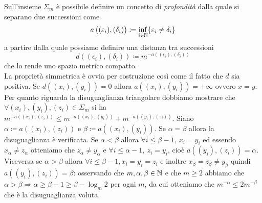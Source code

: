 Sull'insieme $ \Sigma_m $ è possibile definire un concetto di \emph{profondità} dalla quale si separano due successioni come 
\[
a\left((\varepsilon_i), (\delta_i)\right) \coloneqq \inf_{i \in \mathbb{N}} \{\varepsilon_i \neq \delta_i\}
\]
a partire dalla quale possiamo definire una distanza tra successioni
\[
d\left((\epsilon_i), (\delta_i)\right) \coloneqq m^{-a\left((\epsilon_i), (\delta_i)\right)}
\]
che lo rende uno spazio metrico compatto. \\

La proprietà simmetrica è ovvia per costruzione così come il fatto che $ d $ sia positiva. Se $ d((x_i), (y_i)) = 0 $ allora $ a((x_i), (y_i)) = +\infty $ ovvero $ x = y $. Per quanto riguarda la disuguaglianza triangolare dobbiamo mostrare che $ \forall (x_i), (y_i), (z_i) \in \Sigma_m $ si ha $ m^{-a((x_i),(z_i))} \leq m^{-a((x_i), (y_i))} + m^{-a((y_i), (z_i))} $. Siano $ \alpha \coloneqq a((x_i), (z_i)) $ e $ \beta \coloneqq a((x_i), (y_i)) $. Se $ \alpha = \beta $ allora la disuguaglianza è verificata. Se $ \alpha < \beta $ allora $ \forall i \leq \beta-1, \ x_i = y_i $ ed essendo $ x_\alpha \neq z_\alpha $ otteniamo che $ z_\alpha \neq y_\alpha $ e $ \forall i \leq \alpha-1, \ z_i = y_i $, cioè $ a((y_i), (z_i)) = \alpha $. Viceversa se $ \alpha > \beta $ allora $ \forall i \leq \beta-1, x_i=y_i=z_i $ e inoltre $ x_\beta=z_\beta \neq y_\beta $ quindi $ a((y_i), (z_i)) = \beta $: osservando che $ m, \alpha, \beta \in \mathbb{N} $ e che $ m \geq 2 $ abbiamo che $ \alpha > \beta \Rightarrow \alpha \geq \beta - 1 \geq \beta - \log_m 2 $ per ogni $ m $, da cui otteniamo che $ m^{-\alpha} \leq 2m^{-\beta} $ che è la disuguaglianza voluta. \\

